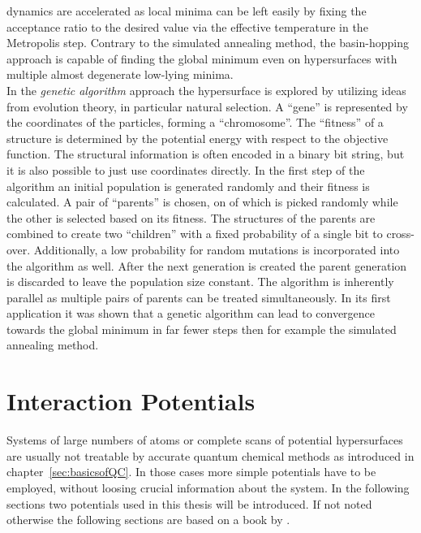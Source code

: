 dynamics are accelerated as local minima can be left easily by fixing the
acceptance ratio to the desired value via the effective temperature in the
Metropolis step. Contrary to the simulated annealing method, the basin-hopping
approach is capable of finding the global minimum even on hypersurfaces with
multiple almost degenerate low-lying minima.
%
\\\newline
In the \textit{genetic algorithm}
approach\autocite{Goldberg_GeneticAlgorithmsSearch_1989} the hypersurface is
explored by utilizing ideas from evolution theory, in particular natural
selection. A ``gene'' is represented by the coordinates of the particles,
forming a ``chromosome''. The ``fitness'' of a structure is determined by the
potential energy with respect to the objective function. The structural
information is often encoded in a binary bit string, but it is also possible to
just use coordinates directly. In the first step of the algorithm an initial
population is generated randomly and their fitness is calculated. A pair of
``parents'' is chosen, on of which is picked randomly while the other is
selected based on its fitness. The structures of the parents are combined to
create two ``children'' with a fixed probability of a single bit to cross-over.
Additionally, a low probability for random mutations is incorporated into the
algorithm as well. After the next generation is created the parent generation is
discarded to leave the population size constant. The algorithm is inherently
parallel as multiple pairs of parents can be treated simultaneously. In its
first application it was shown that a genetic algorithm can lead to convergence
towards the global minimum in far fewer steps then for example the simulated
annealing method.\autocite{Hartke_Globalgeometryoptimization_1993}



\chapter{Interaction Potentials}
\label{sec:energylandscapes}

Systems of large numbers of atoms or complete scans of potential hypersurfaces
are usually not treatable by accurate quantum chemical methods as introduced in
chapter~\ref{sec:basicsofQC}. In those cases more simple potentials have to be
employed, without loosing crucial information about the system. In the following
sections two potentials used in this thesis will be introduced. If not noted
otherwise the following sections are based on a book by
\citeauthor{Hirschfelder_Moleculartheorygases_1964}.\autocite{Hirschfelder_Moleculartheorygases_1964} 

